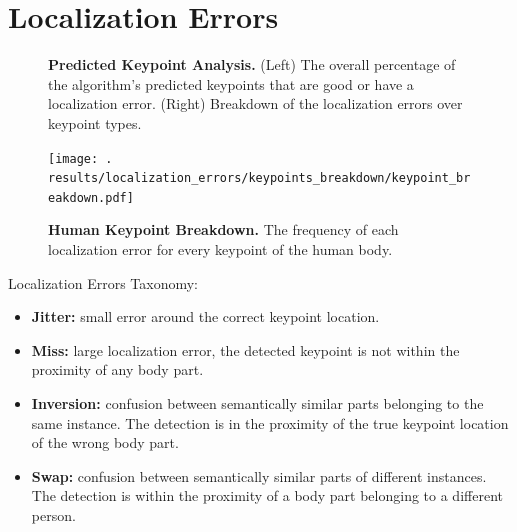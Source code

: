 \documentclass[10pt,onecolumn,letterpaper]{article}
\begin{document}
\clearpage

\section{Localization Errors}

\begin{figure}[h!]
\centering
{}
\caption{ {\small \textbf{Predicted Keypoint Analysis.}
(Left) The overall percentage of the algorithm's predicted keypoints that are good or have a localization error.
(Right) Breakdown of the localization errors over keypoint types.}}
\end{figure}

\begin{figure}
\texttt{[image: .\\results/localization\_errors/keypoints\_breakdown/keypoint\_breakdown.pdf]}
\caption{ {\small \textbf{Human Keypoint Breakdown.} The frequency of each localization error for every keypoint of the human body.}}
\end{figure}

Localization Errors Taxonomy:
\begin{itemize}
\item \textbf{Jitter:} small error around the correct keypoint location.

\item \textbf{Miss:} large localization error, the detected keypoint is not within the proximity of any body part.

\item \textbf{Inversion:} confusion between semantically similar parts belonging to the same instance. The detection is in the proximity of the true keypoint location of the wrong body part.

\item \textbf{Swap:} confusion between semantically similar parts of different instances. The detection is within the proximity of a body part belonging to a different person.

\end{itemize}
\end{document}
